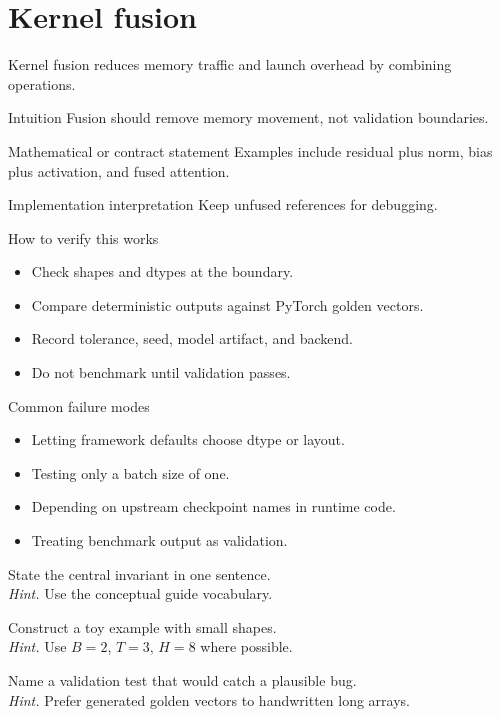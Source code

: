 \chapter{Kernel fusion}
\label{ch:fusion}
Kernel fusion reduces memory traffic and launch overhead by combining operations.



\begin{intuitionbox}{Intuition}
Fusion should remove memory movement, not validation boundaries.
\end{intuitionbox}

\begin{definitionbox}{Mathematical or contract statement}
Examples include residual plus norm, bias plus activation, and fused attention.
\end{definitionbox}

\begin{implementationbox}{Implementation interpretation}
Keep unfused references for debugging.
\end{implementationbox}

\begin{verificationbox}{How to verify this works}
\begin{itemize}
\item Check shapes and dtypes at the boundary.
\item Compare deterministic outputs against PyTorch golden vectors.
\item Record tolerance, seed, model artifact, and backend.
\item Do not benchmark until validation passes.
\end{itemize}
\end{verificationbox}

\begin{warningbox}{Common failure modes}
\begin{itemize}
\item Letting framework defaults choose dtype or layout.
\item Testing only a batch size of one.
\item Depending on upstream checkpoint names in runtime code.
\item Treating benchmark output as validation.
\end{itemize}
\end{warningbox}

\begin{chapterexercises}
\item State the central invariant in one sentence.\\
\textit{Hint.} Use the conceptual guide vocabulary.
\item Construct a toy example with small shapes.\\
\textit{Hint.} Use $B=2$, $T=3$, $H=8$ where possible.
\item Name a validation test that would catch a plausible bug.\\
\textit{Hint.} Prefer generated golden vectors to handwritten long arrays.
\end{chapterexercises}

